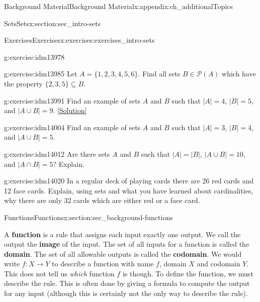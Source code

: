 \documentclass[oneside,10pt,]{book}
\newcommand{\terminology}[1]{\textbf{#1}}
\numberwithin{equation}{chapter}
\def\pow{\mathcal P}
\begin{document}
\begin{appendixptx}{Background Material}{}{Background Material}{}{}{x:appendix:ch_additionalTopics}
\begin{sectionptx}{Sets}{}{Sets}{}{}{x:section:sec_intro-sets}
\begin{exercises-subsection}{Exercises}{}{Exercises}{}{}{x:exercises:exercises_intro-sets}
\begin{divisionexercise}{11}{}{}{g:exercise:idm13978}
\end{divisionexercise}%
\begin{divisionexercise}{12}{}{}{g:exercise:idm13985}%
Let \(A = \{1,2,3,4,5,6\}\). Find all sets \(B \in \pow(A)\) which have the property \(\{2,3,5\} \subseteq B\).%
\end{divisionexercise}%
\begin{divisionexercise}{13}{}{}{g:exercise:idm13991}%
Find an example of sets \(A\) and \(B\) such that \(|A| = 4\), \(|B| = 5\), and \(|A \cup B| = 9\).%
\space\hspace*{0pt}\hfill{\tiny\hyperlink{g:solution:idm13999-main}{[Solution]}}\end{divisionexercise}%
\begin{divisionexercise}{14}{}{}{g:exercise:idm14004}%
Find an example of sets \(A\) and \(B\) such that \(|A| = 3\), \(|B| = 4\), and \(|A \cup B| = 5\).%
\end{divisionexercise}%
\begin{divisionexercise}{15}{}{}{g:exercise:idm14012}%
Are there sets \(A\) and \(B\) such that \(|A| = |B|\), \(|A\cup B| = 10\), and \(|A\cap B| = 5\)? Explain.%
\end{divisionexercise}%
\begin{divisionexercise}{16}{}{}{g:exercise:idm14020}%
In a regular deck of playing cards there are 26 red cards and 12 face cards. Explain, using sets and what you have learned about cardinalities, why there are only 32 cards which are either red or a face card.%
\end{divisionexercise}%
\end{exercises-subsection}
\end{sectionptx}
%
%
\typeout{************************************************}
\typeout{************************************************}
%
\begin{sectionptx}{Functions}{}{Functions}{}{}{x:section:sec_background-functions}
\(\textit{}\)\begin{introduction}{}%
A \terminology{function} is a rule that assigns each input exactly one output.  We call the output the \terminology{image} of the input.  The set of all inputs for a function is called the \terminology{domain}. The set of all allowable outputs is called the \terminology{codomain}. We would write \(f:X \to Y\) to describe a function with name \(f\), domain \(X\) and codomain \(Y\). This does not tell us \emph{which} function \(f\) is though. To define the function, we must describe the rule. This is often done by giving a formula to compute the output for any input (although this is certainly not the only way to describe the rule).%

\end{introduction}
\end{sectionptx}
\end{appendixptx}
\end{document}
